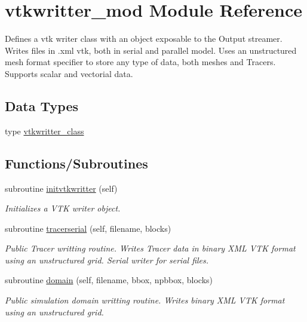 \hypertarget{namespacevtkwritter__mod}{}\section{vtkwritter\+\_\+mod Module Reference}
\label{namespacevtkwritter__mod}


Defines a vtk writer class with an object exposable to the Output streamer. Writes files in .xml vtk, both in serial and parallel model. Uses an unstructured mesh format specifier to store any type of data, both meshes and Tracers. Supports scalar and vectorial data.  


\subsection*{Data Types}
\begin{DoxyCompactItemize}
\item 
type \mbox{\hyperlink{structvtkwritter__mod_1_1vtkwritter__class}{vtkwritter\+\_\+class}}
\end{DoxyCompactItemize}
\subsection*{Functions/\+Subroutines}
\begin{DoxyCompactItemize}
\item 
subroutine \mbox{\hyperlink{namespacevtkwritter__mod_abd35d591c8e15730a277b2d26deb83e8}{initvtkwritter}} (self)
\begin{DoxyCompactList}\small\item\em Initializes a V\+TK writer object. \end{DoxyCompactList}\item 
subroutine \mbox{\hyperlink{namespacevtkwritter__mod_ac11e4d1d71141e6de89ba67508212ce0}{tracerserial}} (self, filename, blocks)
\begin{DoxyCompactList}\small\item\em Public Tracer writting routine. Writes Tracer data in binary X\+ML V\+TK format using an unstructured grid. Serial writer for serial files. \end{DoxyCompactList}\item 
subroutine \mbox{\hyperlink{namespacevtkwritter__mod_a9f44d9fd1c5da759c4f2d721d12a8181}{domain}} (self, filename, bbox, npbbox, blocks)
\begin{DoxyCompactList}\small\item\em Public simulation domain writting routine. Writes binary X\+ML V\+TK format using an unstructured grid. \end{DoxyCompactList}\end{DoxyCompactItemize}
